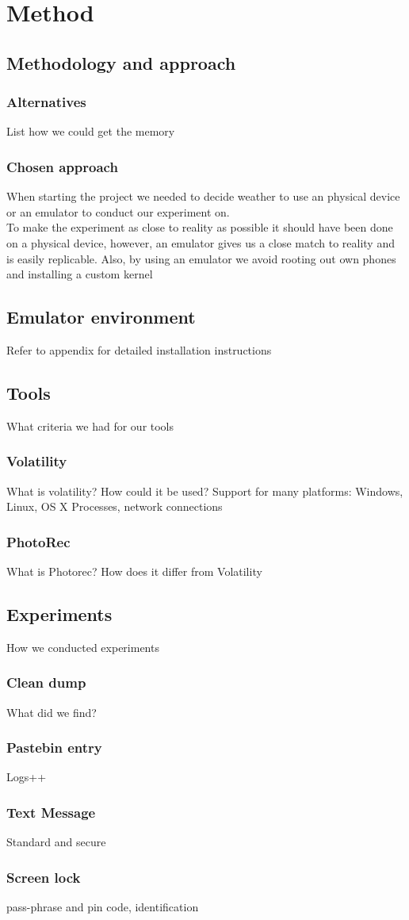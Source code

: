 \section{Method}
\subsection{Methodology and approach}
\subsubsection{Alternatives}
List how we could get the memory
\subsubsection{Chosen approach}
When starting the project we needed to decide weather to use an physical device or an emulator
to conduct our experiment on.\\
To make the experiment as close to reality as possible it should have been done on a physical device, 
however, an emulator gives us a close match to reality and is easily replicable. Also, by using an emulator 
we avoid rooting out own phones and installing a custom kernel
\subsection{Emulator environment}
Refer to appendix for detailed installation instructions
\subsection{Tools}
What criteria we had for our tools
\subsubsection{Volatility}
What is volatility? How could it be used?
Support for many platforms: Windows, Linux, OS X
Processes, network connections
\subsubsection{PhotoRec}
What is Photorec? How does it differ from Volatility
\subsection{Experiments}
How we conducted experiments
\subsubsection{Clean dump}
What did we find?
\subsubsection{Pastebin entry}
Logs++
\subsubsection{Text Message}
Standard and secure
\subsubsection{Screen lock}
pass-phrase and pin code, identification
